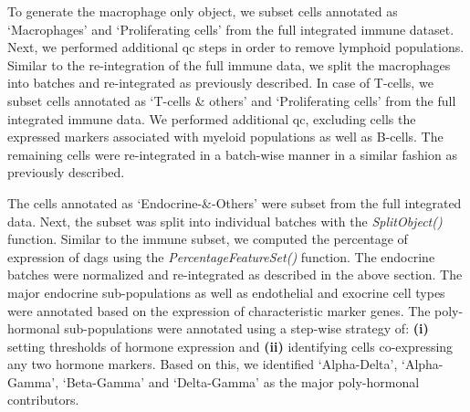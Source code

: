 \par To generate the macrophage only object, we subset cells annotated as `Macrophages' and `Proliferating cells' from the full integrated immune dataset. Next, we performed additional \gls{qc} steps in order to remove lymphoid populations. Similar to the re-integration of the full immune data, we split the macrophages into batches and re-integrated as previously described. In case of T-cells, we subset cells annotated as `T-cells \& others' and `Proliferating cells' from the full integrated immune data. We performed additional \gls{qc}, excluding cells the expressed markers associated with myeloid populations as well as B-cells. The remaining cells were re-integrated in a batch-wise manner in a similar fashion as previously described.\\


\par The cells annotated as `Endocrine-\&-Others' were subset from the full integrated data. Next, the subset was split into individual batches with the \textit{SplitObject()} function. Similar to the immune subset, we computed the percentage of expression of \glspl{dag} using the \textit{PercentageFeatureSet()} function. The endocrine batches were normalized and re-integrated as described in the above section. The major endocrine sub-populations as well as endothelial and exocrine cell types were annotated based on the expression of characteristic marker genes. The poly-hormonal sub-populations were annotated using a step-wise strategy of: \textbf{(i)} setting thresholds of hormone expression and \textbf{(ii)} identifying cells co-expressing any two hormone markers. Based on this, we identified `Alpha-Delta’, `Alpha-Gamma’, `Beta-Gamma’ and `Delta-Gamma’ as the major poly-hormonal contributors.\\



